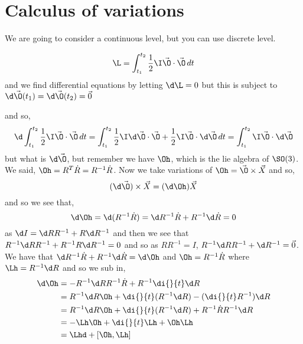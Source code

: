 
\section{Calculus of variations}
We are going to consider a continuous level, but you can use discrete level.
\begin{nthm}
  $$ \L = \int_{t_1}^{t_2} \frac{1}{2}\I\vec \O \cdot \vec\O \,dt $$
  and we find differential equations by letting $\d\L = 0$ but this is subject to $\d\vec\O(t_1) = \d\vec\O(t_2) = \vec 0$
\end{nthm}
and so,
$$ \d\int_{t_1}^{t_2} \frac{1}{2}\I\vec\O \cdot \vec\O\, dt = \int_{t_1}^{t_2} \frac{1}{2}\I\d\vec\O \cdot \vec\O + \frac{1}{2}\I\vec\O \cdot \d\vec\O \, dt  = \int_{t_1}^{t_2}\I\vec\O \cdot \d\vec\O$$
but what is $\d\vec\O$, but remember we have $\Oh$, which is the lie algebra of $\SO(3)$. We said, $\Oh = R^T\dot R = R^{-1}\dot R$. Now we take variations of $\Oh = \vec\O \times \vec X$ and so,
$$ (\d \vec \O)\times\vec X = (\d\Oh) \vec X $$
and so we see that,
$$ \d\Oh = \d(R^{-1}\dot R) = \d R^{-1}\dot R + R^{-1}\d\dot R = 0 $$
as $\d I = \d RR^{-1} + R\d R^{-1}$ and then we see that $R^{-1}\d R R^{-1} + R^{-1}R \d R^{-1} = 0$ and so as $RR^{-1} = I$, $R^{-1}\d RR^{-1} + \d R^{-1} = \vec 0$. We have that $\d R^{-1}\dot R + R^{-1}\d \dot R = \d \Oh$ and $\Oh = R^{-1}\dot R$ where $\Lh = R^{-1}\d R$ and so we sub in,
\begin{align*}
  \d\Oh &= -R^{-1}\d R R^{-1}\dot R + R^{-1}\di{}{t}\d R\\
  &= R^{-1}\d R \Oh + \di{}{t}(R^{-1}\d R) - (\di{}{t}R^{-1})\d R\\
  &= R^{-1}\d R \Oh + \di{}{t}(R^{-1}\d R) + R^{-1}\dot R R^{-1}\d R\\
  &= - \Lh\Oh + \di{}{t}\Lh + \Oh\Lh\\
  &=\Lhd + [\Oh, \Lh]
\end{align*}

